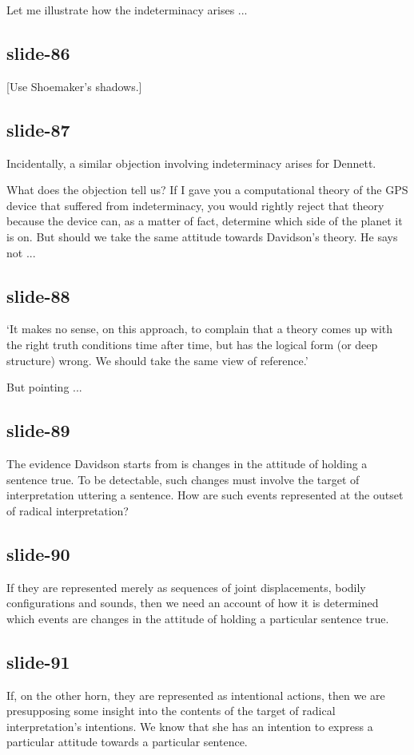 \documentclass[12pt,\papersize]{extarticle}
\begin{document}
Let me illustrate how the indeterminacy arises ...

\subsection{slide-86}
[Use Shoemaker’s shadows.]

\subsection{slide-87}
Incidentally, a similar objection involving indeterminacy arises for Dennett.

What does the objection tell us?
If I gave you a computational theory of the GPS device that suffered from
indeterminacy, you would rightly reject that theory because the device
can, as a matter of fact, determine which side of the planet it is on.
But should we take the same attitude towards Davidson’s theory.
He says not ...

\subsection{slide-88}
‘It makes no sense, on this approach, to complain that a theory comes up with
the right truth conditions time after time, but has the logical form
(or deep structure) wrong. We should take the same view of reference.’
\citep[p.~223]{Davidson:1977kn}

But pointing ...

\subsection{slide-89}
The evidence Davidson starts from is changes in the attitude of holding
a sentence true.  To be detectable, such changes must involve the target
of interpretation uttering a sentence.
How are such events represented at the outset of radical interpretation?

\subsection{slide-90}
If they are represented merely as sequences of joint displacements,
bodily configurations and sounds, then we need an account of how it is determined
which events are changes in the attitude of holding a particular sentence true.

\subsection{slide-91}
If, on the other horn, they are represented as intentional actions, then
we are presupposing some insight into the contents of the target of radical
interpretation’s intentions.
We know that she has an intention to express a particular attitude towards
a particular sentence.
\end{document}
